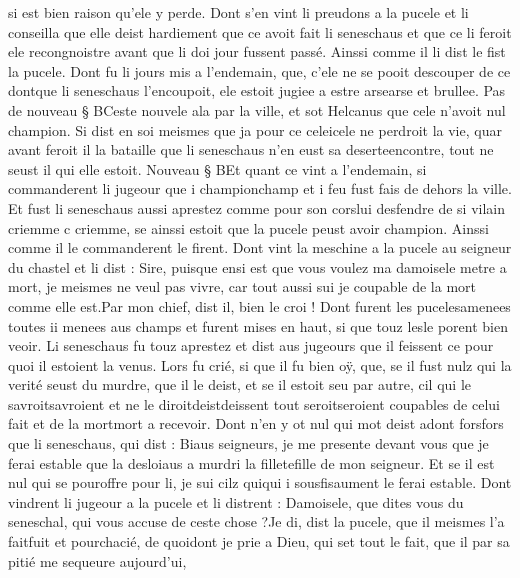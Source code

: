 \documentclass{article}
\begin{document}
\begin{pages}
      si est bien raison qu’ele y perde.
   Dont s’en vint li preudons
   a la pucele et li conseilla que elle deist hardiement que
      ce avoit fait li seneschaus et que ce li feroit
         ele recongnoistre avant que 
         li doi jour fussent passé.
   Ainssi comme il li dist le fist la pucele. Dont fu li jours mis a l’endemain, que, 
   c’ele ne se pooit descouper de ce dontque li 
   seneschaus l’encoupoit, ele estoit jugiee a estre 
   arsearse et brullee. \pend
\pstart Pas de nouveau § BCeste nouvele ala par 
   la ville, et sot Helcanus que cele n'avoit nul champion.
   Si dist en soi meismes que ja pour ce 
      celeicele ne 
      perdroit la vie, quar avant feroit il la bataille que li seneschaus
      n’en eust 
      sa deserteencontre, tout ne seust il qui elle estoit.
   Nouveau § BEt quant ce vint a l’endemain, si commanderent 
   li jugeour que i
      championchamp et i feu fust fais
      de dehors la ville.
   Et fust li seneschaus aussi aprestez 
   comme pour son corslui
   desfendre de si vilain criemme
      c criemme,
   se ainssi estoit que la pucele peust avoir champion. Ainssi comme il le commanderent le firent.
   Dont vint la meschine a la pucele au
   seigneur 
      du chastel et li dist :
   Sire, puisque ensi est que vous voulez ma damoisele metre a mort,
      je meismes ne veul pas vivre, car tout aussi sui je coupable de la mort comme elle est.Par mon chief, dist il, bien le croi !
   Dont furent les pucelesamenees toutes ii menees aus 
   champs et furent mises en haut, si que touz lesle porent bien veoir.
   Li seneschaus fu touz aprestez et dist aus 
   jugeours que il feissent ce pour quoi il estoient la venus.
   Lors fu crié, si que il fu bien oÿ, que, se il fust nulz qui la verité seust du murdre, que il le deist, et se il estoit seu par autre, 
   cil qui le savroitsavroient et ne le 
   diroitdeistdeissent tout 
   seroitseroient coupables 
   de celui fait et de 
   la mortmort a recevoir. 
   Dont n'en y ot nul qui mot deist adont 
   forsfors que li seneschaus, qui dist :
   Biaus seigneurs, je me presente devant vous que je ferai estable que la desloiaus a
      murdri la filletefille 
      de mon seigneur. Et se il est nul qui se pouroffre pour li,
      je sui cilz quiqui i 
      sousfisaument le ferai estable.
   Dont vindrent li jugeour a la pucele et 
   li distrent :
   Damoisele, que dites vous du seneschal,
      qui vous accuse de ceste chose ?Je di, dist la pucele, que il meismes l’a
      faitfuit et pourchacié, 
      de quoidont je prie a Dieu, qui set
      tout le fait, que il par sa pitié me sequeure aujourd’ui,

\end{pages}
\end{document}

